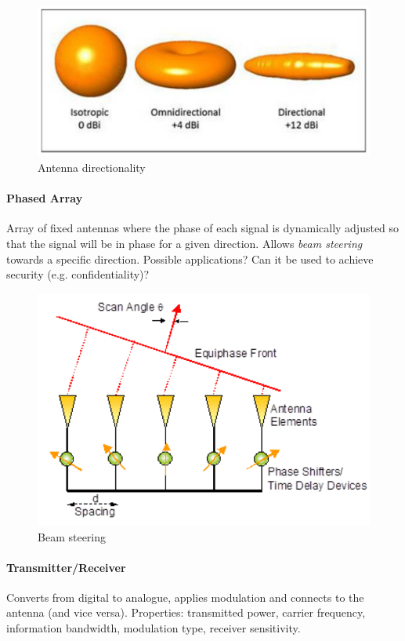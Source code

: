\begin{figure}
	\centering
	\includegraphics[scale=0.4]{images/1-directionality.png}
	\caption{Antenna directionality}
	\label{fig:directionality}
\end{figure}

\paragraph{Phased Array}
Array of fixed antennas where the phase of each signal is dynamically adjusted so that the signal will be in phase for a given direction.
Allows \textit{beam steering} towards a specific direction.
Possible applications? Can it be used to achieve security (e.g. confidentiality)?

\begin{figure}
	\centering
	\includegraphics[scale=0.4]{images/1-beam-steering.png}
	\caption{Beam steering}
	\label{fig:beam-steering}
\end{figure}

\paragraph{Transmitter/Receiver}
Converts from digital to analogue, applies modulation and connects to the antenna (and vice versa).
Properties: transmitted power, carrier frequency, information bandwidth, modulation type, receiver sensitivity.

